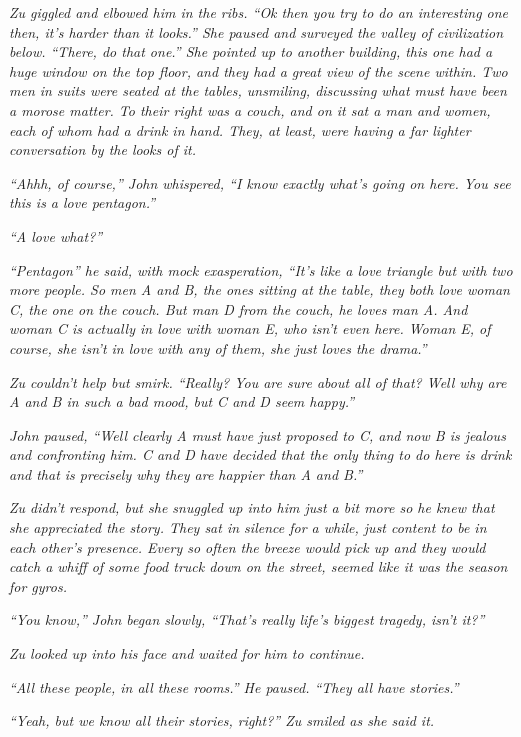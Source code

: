 \documentclass[12pt,oneside,openany]{memoir}
\begin{document}
\textit{	Zu giggled and elbowed him in the ribs. “Ok then you try to do an interesting one then, it’s harder than it looks.” She paused and surveyed the valley of civilization below. “There, do that one.” She pointed up to another building, this one had a huge window on the top floor, and they had a great view of the scene within. Two men in suits were seated at the tables, unsmiling, discussing what must have been a morose matter. To their right was a couch, and on it sat a man and women, each of whom had a drink in hand. They, at least, were having a far lighter conversation by the looks of it.}
	
\textit{	“Ahhh, of course,” John whispered, “I know exactly what’s going on here. You see this is a love pentagon.”}
	
\textit{	“A love what?”}
	
\textit{	“Pentagon” he said, with mock exasperation, “It’s like a love triangle but with two more people. So men A and B, the ones sitting at the table, they both love woman C, the one on the couch. But man D from the couch, he loves man A. And woman C is actually in love with woman E, who isn’t even here. Woman E, of course, she isn’t in love with any of them, she just loves the drama.”}
	
\textit{	Zu couldn’t help but smirk. “Really? You are sure about all of that? Well why are A and B in such a bad mood, but C and D seem happy.”}
	
\textit{	John paused, “Well clearly A must have just proposed to C, and now B is jealous and confronting him. C and D have decided that the only thing to do here is drink and that is precisely why they are happier than A and B.”}
	
\textit{	Zu didn’t respond, but she snuggled up into him just a bit more so he knew that she appreciated the story. They sat in silence for a while, just content to be in each other’s presence. Every so often the breeze would pick up and they would catch a whiff of some food truck down on the street, seemed like it was the season for gyros.}
	
\textit{	“You know,” John began slowly, “That’s really life’s biggest tragedy, isn’t it?”}
	
\textit{	Zu looked up into his face and waited for him to continue.
}
	
\textit{	“All these people, in all these rooms.” He paused. “They all have stories.”}
	
\textit{	“Yeah, but we know all their stories, right?” Zu smiled as she said it.}
	
\end{document}
